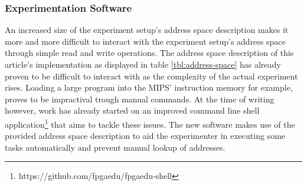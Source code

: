 \documentclass{article}
\begin{document}
\subsubsection{Experimentation Software}
An increased size of the experiment setup's address space description makes it more and more difficult to interact with the experiment setup's address space through simple read and write operations. The address space description of this article's implementation as displayed in table \ref{tbl:address-space} has already proven to be difficult to interact with as the complexity of the actual experiment rises. Loading a large program into the MIPS' instruction memory for example, proves to be impractival trough manual commands. At the time of writing however, work has already started on an improved command line shell application\footnote{https://github.com/fpgaedu/fpgaedu-shell} that aims to tackle these issues. The new software makes use of the provided address space description to aid the experimenter in executing some tasks automatically and prevent manual lookup of addresses. 


\newpage
\printbibliography
\end{document}
